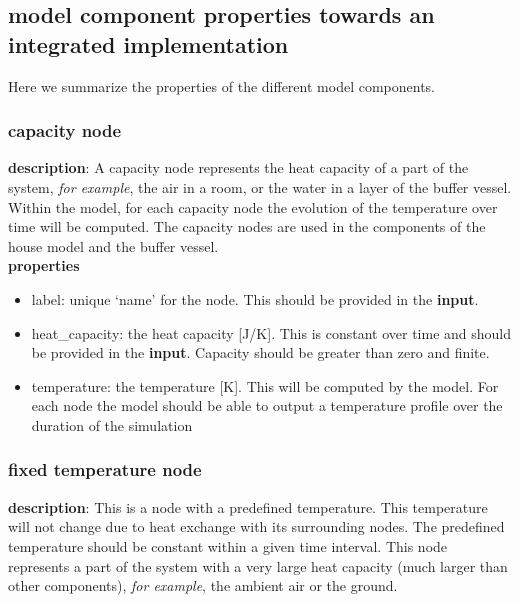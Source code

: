 \subsection{model component properties towards an integrated implementation}
Here we summarize the properties of the different model components. 

\subsubsection{capacity node}

\textbf{description}: A capacity node represents the heat capacity of a part of the system, \textit{for example}, the air in a room, or the water in a layer of the buffer vessel. Within the model, for each capacity node the evolution of the temperature over time will be computed. The capacity nodes are used in the components of the house model and the buffer vessel. 
\\
\textbf{properties}

\begin{itemize}
	\item label: unique `name' for the node. This should be provided in the \textbf{input}.
	\item heat\_capacity: the heat capacity [J/K]. This is constant over time and should be provided in the \textbf{input}. Capacity should be greater than zero and finite.  
	\item temperature: the temperature [K]. This will be computed by the model. For each node the model should be able to output a temperature profile over the duration of the simulation
\end{itemize}


\subsubsection{fixed temperature node}
\textbf{description}: This is a node with a predefined temperature. This temperature will not change due to heat exchange with its surrounding nodes. The predefined temperature should be constant within a given time interval. This node represents a part of the system with a very large heat capacity (much larger than other components), \textit{for example}, the ambient air or the ground. 

